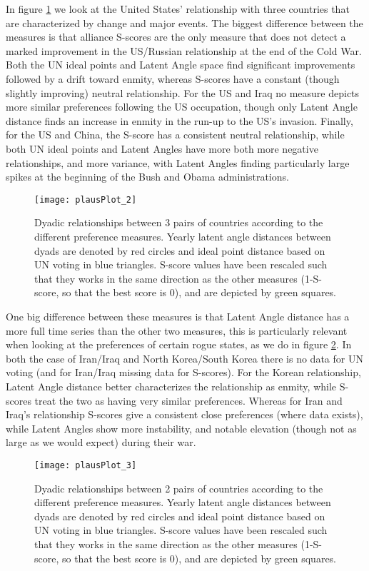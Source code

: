 In figure \ref{unfriendly:dyads} we look at the United States' relationship with three countries that are characterized by change and major events. The biggest difference between the measures is that alliance S-scores are the only measure that does not detect a marked improvement in the US/Russian relationship at the end of the Cold War. Both the UN ideal points and Latent Angle space find significant improvements followed by a drift toward enmity, whereas S-scores have a constant (though slightly improving) neutral relationship. For the US and Iraq no measure depicts more similar preferences following the US occupation, though only Latent Angle distance finds an increase in enmity in the run-up to the US's invasion. Finally, for the US and China, the S-score has a consistent neutral relationship, while both UN ideal points and Latent Angles have more both more negative relationships, and more variance, with Latent Angles finding particularly large spikes at the beginning of the Bush and Obama administrations.

\begin{figure}
	\centering
	\texttt{[image: plausPlot\_2]}
	\caption{Dyadic relationships between 3 pairs of countries according to the different preference measures. Yearly latent angle distances between dyads are denoted by red circles and ideal point distance based on UN voting in blue triangles. S-score values have been rescaled such that they works in the same direction as the other measures (1-S-score, so that the best score is 0), and are depicted by green squares.}
	\label{unfriendly:dyads}
\end{figure}

One big difference between these measures is that Latent Angle distance has a more full time series than the other two measures, this is particularly relevant when looking at the preferences of certain rogue states, as we do in figure \ref{missing:dyads}. In both the case of Iran/Iraq and North Korea/South Korea there is no data for UN voting (and for Iran/Iraq missing data for S-scores). For the Korean relationship, Latent Angle distance better characterizes  the relationship as enmity, while S-scores treat the two as having very similar preferences. Whereas for Iran and Iraq's relationship S-scores give a consistent close preferences (where data exists), while Latent Angles show more instability, and notable elevation (though not as large as we would expect) during their war.


\begin{figure}
	\centering
	\texttt{[image: plausPlot\_3]}
	\caption{Dyadic relationships between 2 pairs of countries according to the different preference measures. Yearly latent angle distances between dyads are denoted by red circles and ideal point distance based on UN voting in blue triangles. S-score values have been rescaled such that they works in the same direction as the other measures (1-S-score, so that the best score is 0), and are depicted by green squares.}
	\label{missing:dyads}
\end{figure}

